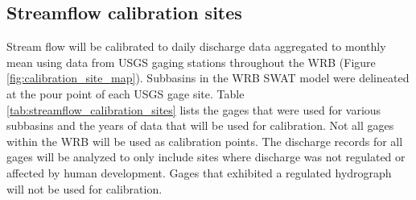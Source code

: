 \subsection{Streamflow calibration sites}\label{sec:streamflow_calibration_sites}

Stream flow will be calibrated to daily discharge data aggregated to monthly mean using data from USGS gaging stations throughout the WRB (Figure \ref{fig:calibration_site_map}). 
Subbasins in the WRB SWAT model were delineated at the pour point of each USGS gage site. 
Table \ref{tab:streamflow_calibration_sites} lists the gages that were used for various subbasins and the years of data that will be used for calibration. Not all gages within the WRB will be used as calibration points. 
The discharge records for all gages will be analyzed to only include sites where discharge was not regulated or affected by human development.
 Gages that exhibited a regulated hydrograph will not be used for calibration.
